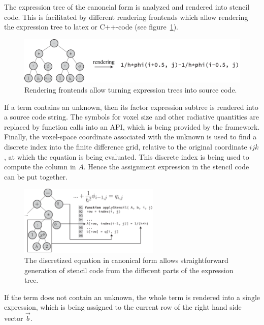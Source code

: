 The expression tree of the canoncial form is analyzed and rendered into stencil code. This is facilitated by different rendering frontends which allow rendering the expression tree to latex or C++-code (see figure~\ref{fig:pn_math_expression_tree_rendering}).
\begin{figure}[h]
\centering
\includegraphics[width=1.0\textwidth]{04_pn_method/figures/fig_car_rendering.pdf}
\caption{Rendering frontends allow turning expression trees into source code.}
\label{fig:pn_math_expression_tree_rendering}
\end{figure}

If a term contains an unknown, then its factor expression subtree is rendered into a source code string. The symbols for voxel size and other radiative quantities are replaced by function calls into an API, which is being provided by the framework. Finally, the voxel-space coordinate associated with the unknown is used to find a discrete index into the finite difference grid, relative to the original coordinate $ijk$, at which the equation is being evaluated. This discrete index is being used to compute the column in $A$. Hence the assignment expression in the stencil code can be put together.
\begin{figure}[h]
\centering
\includegraphics[width=0.6\textwidth]{04_pn_method/figures/fig_car_canonical_to_code.pdf}
\caption{The discretized equation in canonical form allows straightforward generation of stencil code from the different parts of the expression tree.}
\label{fig:pn_discretization_codegen}
\end{figure}

If the term does not contain an unknown, the whole term is rendered into a single expression, which is being assigned to the current row of the right hand side vector $\vec{b}$.

